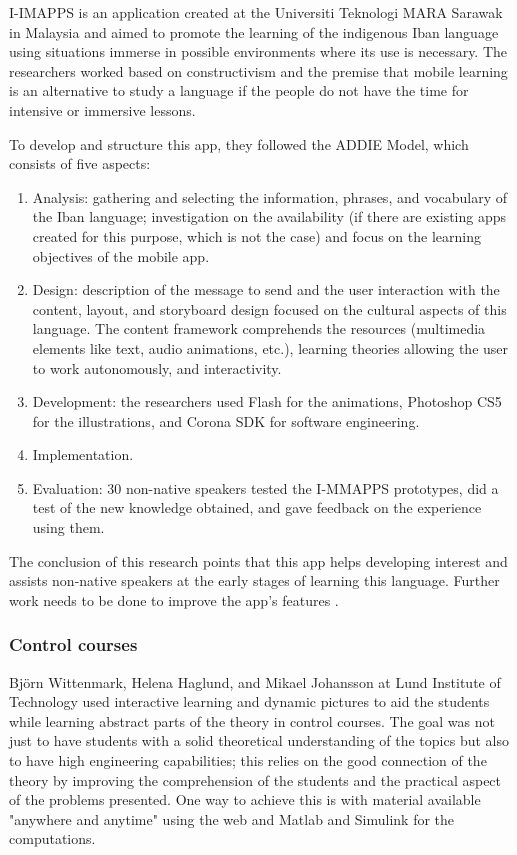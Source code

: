 I-IMAPPS is an application created at the Universiti Teknologi MARA Sarawak in Malaysia and aimed to promote the learning of the indigenous Iban language using situations immerse in possible environments where its use is necessary. The researchers worked based on constructivism and the premise that mobile learning is an alternative to study a language if the people do not have the time for intensive or immersive lessons. 


To develop and structure this app, they followed the ADDIE Model, which consists of five aspects: 

\begin{enumerate}
    \item Analysis: gathering and selecting the information, phrases, and vocabulary of the Iban language; investigation on the availability (if there are existing apps created for this purpose, which is not the case) and focus on the learning objectives of the mobile app.
    \item Design: description of the message to send and the user interaction with the content, layout, and storyboard design focused on the cultural aspects of this language. The content framework comprehends the resources (multimedia elements like text, audio animations, etc.), learning theories allowing the user to work autonomously, and interactivity.
    
    \item Development: the researchers used Flash for the animations, Photoshop CS5  for the illustrations, and Corona SDK for software engineering. 

    
    \item Implementation.
    
    \item Evaluation: 30 non-native speakers tested the I-MMAPPS prototypes, did a test of the new knowledge obtained, and gave feedback on the experience using them.
    
\end{enumerate}

The conclusion of this research points that this app helps developing interest and assists non-native speakers at the early stages of learning this language. Further work needs to be done to improve the app's features \cite{CHACHIL2015267}. 



\subsubsection{Control courses}
Björn Wittenmark, Helena Haglund, and Mikael Johansson at Lund Institute of Technology used interactive learning and dynamic pictures to aid the students while learning abstract parts of the theory in control courses. The goal was not just to have students with a solid theoretical understanding of the topics but also to have high engineering capabilities; this relies on the good connection of the theory by improving the comprehension of the students and the practical aspect of the problems presented. One way to achieve this is with material available "anywhere and anytime" using the web and Matlab and Simulink for the computations. 

